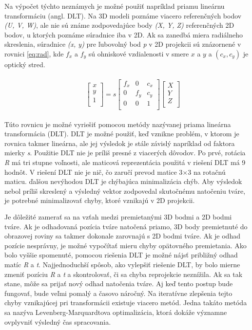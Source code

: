 \documentclass[slovak,master,dept460,male,cpp,cpdeclaration]{diploma}
\begin{document}
Na výpočet týchto neznámych je možné použiť napríklad  priamu lineárnu transformáciu (angl. DLT). Na 3D modeli poznáme viacero referenčných bodov \textit{(U, V, W)}, ale  nie sú známe zodpovedajúce body \textit{(X, Y, Z)} referenčných 2D bodov, u ktorých poznáme súradnice iba v 2D. Ak sa zanedbá miera radiálneho skreslenia, súradnice  \textit{(x, y)} pre ľubovolný bod \textit{p} v 2D projekcii sú znázornené v rovnici \ref{eq:rad}, kde $f_x$ a $f_y$ sú ohniskové vzdialenosti v smere $x$ a $y$ a $(c_x, c_y)$ je optický stred.

\begin{eqnarray}
\begin{split}
&\ \ \ \ \begin{bmatrix}
x\\ 
y\\ 
1\\
\end{bmatrix}
=  s
\begin{bmatrix}
f_{x} & 0 & c_{x}\\ 
0 & f_{y} & c_{y}\\ 
0 & 0 & 1 \\
\end{bmatrix}
\begin{bmatrix}
X\\ 
Y\\ 
Z\\
\end{bmatrix}
\label{eq:rad}
\end{split}
\end{eqnarray}

Túto rovnicu je možné vyriešiť pomocou metódy nazývanej priama lineárna transformácia (DLT). DLT je možné použiť, keď vznikne problém, v ktorom je rovnica takmer lineárna, ale jej výsledok je stále závislý napríklad od faktora mierky \textit{s}. Použitie DLT nie je príliš presné z viacerých dôvodov. Po prvé, rotácia \textit{R} má tri stupne voľnosti, ale maticová reprezentácia použitá v riešení DLT má 9 hodnôt. V riešení DLT nie je nič, čo zaručí prevod  matice 3$\times$3 na rotačnú maticu. ďalšou nevýhodou DLT je  chýbajúca minimalizácia chýb. Aby výsledok nebol príliš skreslený a výsledný vektor zodpovedal  skutočnému natočeniu tváre, je potrebné minimalizovať chyby, ktoré vznikajú v 2D projekcii. \par
Je dôležité zamerať sa na vzťah medzi premietanými 3D bodmi a 2D bodmi tváre. Ak je odhadovaná pozícia tváre natočená priamo, 3D body premietnuté do obrazovej roviny sa takmer dokonale zarovnajú s 2D bodmi tváre. Ak je odhad pozície nesprávny, je možné vypočítať mieru chyby opätovného premietania. Ako bolo vyššie spomenuté, pomocou riešenia DLT je možné nájsť približný odhad matíc \textit{R} a \textit{t}. Najjednoduchší spôsob, ako vylepšiť riešenie DLT, by bolo mierne zmeniť pozíciu \textit{R} a \textit{t} a skontrolovať, či sa chyba reprojekcie neznížila. Ak sa tak stane, môže sa prijať nový odhad natočenia tváre.  Aj keď tento postup bude fungovať, bude veľmi pomalý a časovo náročný. Na iteratívne zlepšenia  tejto chyby vznikajúcej pri transformácii existuje viacero  metód. Jedna takáto metóda sa nazýva Levenberg-Marquardtova optimalizácia\cite{lourakis2005levenberg}, ktorá dokáže významne ovplyvniť výsledný čas spracovania.
\end{document}
